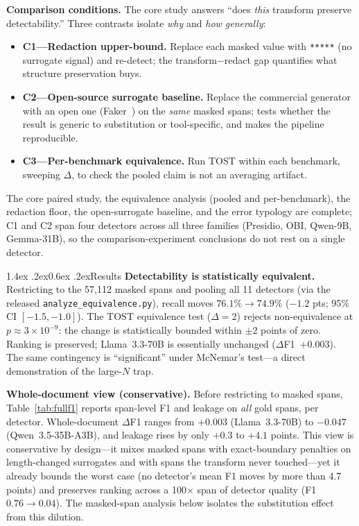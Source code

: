 \documentclass[11pt]{article}
\makeatletter
\renewcommand\section{\@startsection{section}{1}{\z@}%
  {1.4ex \@plus.2ex}{0.6ex \@plus.2ex}{\normalfont\large\bfseries}}
\newcommand{\tp}[1]{\texttt{#1}}
\makeatother
\begin{document}
\textbf{Comparison conditions.} The core study answers ``does \emph{this} transform preserve detectability.'' Three contrasts isolate \emph{why} and \emph{how generally}:
\begin{itemize}\itemsep2pt
\item \textbf{C1---Redaction upper-bound.} Replace each masked value with \tp{*****} (no surrogate signal) and re-detect; the transform$-$redact gap quantifies what structure preservation buys.
\item \textbf{C2---Open-source surrogate baseline.} Replace the commercial generator with an open one (Faker~\citep{faker}) on the \emph{same} masked spans; tests whether the result is generic to substitution or tool-specific, and makes the pipeline reproducible.
\item \textbf{C3---Per-benchmark equivalence.} Run TOST within each benchmark, sweeping $\Delta$, to check the pooled claim is not an averaging artifact.
\end{itemize}
The core paired study, the equivalence analysis (pooled and per-benchmark), the redaction floor, the open-surrogate baseline, and the error typology are complete; C1 and C2 span four detectors across all three families (Presidio, OBI, Qwen-9B, Gemma-31B), so the comparison-experiment conclusions do not rest on a single detector.

\section{Results}\label{sec:results}
\textbf{Detectability is statistically equivalent.} Restricting to the 57{,}112 masked spans and pooling all 11 detectors (via the released \tp{analyze\_equivalence.py}), recall moves $76.1\%\rightarrow74.9\%$ ($-1.2$ pts; 95\% CI $[-1.5,-1.0]$). The TOST equivalence test ($\Delta=2$) rejects non-equivalence at $p\approx3\times10^{-9}$: the change is statistically bounded within $\pm2$ points of zero. Ranking is preserved; Llama~3.3-70B is essentially unchanged ($\Delta$F1~$+0.003$). The same contingency is ``significant'' under McNemar's test---a direct demonstration of the large-$N$ trap.

\textbf{Whole-document view (conservative).} Before restricting to masked spans, Table~\ref{tab:fullf1} reports span-level F1 and leakage on \emph{all} gold spans, per detector. Whole-document $\Delta$F1 ranges from $+0.003$ (Llama~3.3-70B) to $-0.047$ (Qwen~3.5-35B-A3B), and leakage rises by only $+0.3$ to $+4.1$ points. This view is conservative by design---it mixes masked spans with exact-boundary penalties on length-changed surrogates and with spans the transform never touched---yet it already bounds the worst case (no detector's mean F1 moves by more than 4.7 points) and preserves ranking across a 100$\times$ span of detector quality (F1 $0.76\!\rightarrow\!0.04$). The masked-span analysis below isolates the substitution effect from this dilution.
\end{document}
